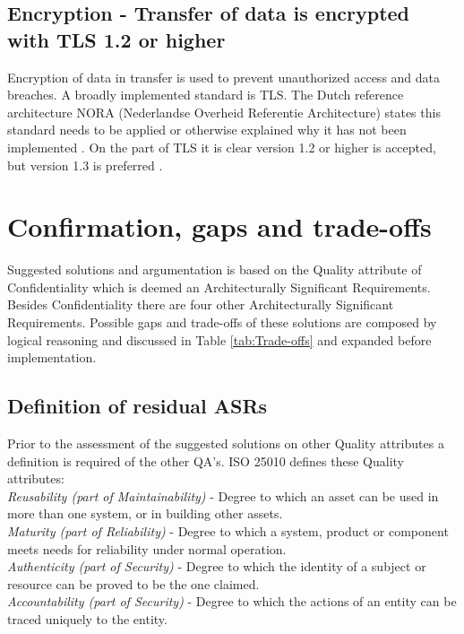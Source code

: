 \subsection{Encryption - Transfer of data is encrypted with TLS 1.2 or higher} \label{encryption}
Encryption of data in transfer is used to prevent unauthorized access and data breaches. A broadly implemented standard is TLS. The Dutch reference architecture NORA (Nederlandse Overheid Referentie Architecture) \cite{NORA} states this standard needs to be applied or otherwise explained why it has not been implemented \cite{NORA_PasToeOfLegUit}. On the part of TLS it is clear version 1.2 or higher is accepted, but version 1.3 is preferred \cite{NORA_TLS}. 

\section{Confirmation, gaps and trade-offs}
Suggested solutions and argumentation is based on the Quality attribute of Confidentiality which is deemed an Architecturally Significant Requirements. Besides Confidentiality there are four other Architecturally Significant Requirements. Possible gaps and trade-offs of these solutions are composed by logical reasoning and discussed in Table \ref{tab:Trade-offs} and expanded before implementation.

\subsection{Definition of residual ASRs}
Prior to the assessment of the suggested solutions on other Quality attributes a definition is required of the other QA's. ISO 25010 \cite{ISO:25010:2011} defines these Quality attributes: \\
\textit{Reusability (part of Maintainability)} - Degree to which an asset can be used in more than one system, or in building other assets. \\
\textit{Maturity (part of Reliability)} - Degree to which a system, product or component meets needs for reliability under normal operation. \\
\textit{Authenticity (part of Security)} - Degree to which the identity of a subject or resource can be proved to be the one claimed. \\
\textit{Accountability (part of Security)} - Degree to which the actions of an entity can be traced uniquely to the entity. \\

